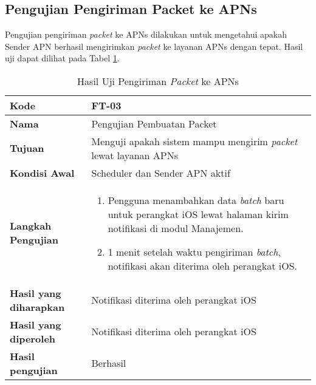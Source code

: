 \subsection{Pengujian Pengiriman Packet ke APNs}
\par Pengujian pengiriman \textit{packet} ke APNs dilakukan untuk mengetahui apakah Sender APN berhasil mengirimkan \textit{packet} ke layanan APNs dengan tepat. Hasil uji dapat dilihat pada Tabel \ref{t:uji_pengiriman_packet_apn}.
\begin{longtable}{|p{3cm}|p{6.5cm}|}
	\caption{Hasil Uji Pengiriman \textit{Packet} ke APNs} \label{t:uji_pengiriman_packet_apn} \\ \hline
	\textbf{Kode} & FT-03 \\ \hline
	\textbf{Nama} & Pengujian Pembuatan Packet \\ \hline
	\textbf{Tujuan} & Menguji apakah sistem mampu mengirim \textit{packet} lewat layanan APNs \\ \hline
	\textbf{Kondisi Awal} & Scheduler dan Sender APN aktif \\ \hline
	\textbf{Langkah Pengujian} &  
	\begin{enumerate}
		\item Pengguna menambahkan data \textit{batch} baru untuk perangkat iOS lewat halaman kirim notifikasi di modul Manajemen.
		\item 1 menit setelah waktu pengiriman \textit{batch}, notifikasi akan diterima oleh perangkat iOS.
	\end{enumerate} \\ \hline
	\textbf{Hasil yang diharapkan} & Notifikasi diterima oleh perangkat iOS \\ \hline
	\textbf{Hasil yang diperoleh} & Notifikasi diterima oleh perangkat iOS \\ \hline
	\textbf{Hasil pengujian} & Berhasil \\ \hline
\end{longtable}

